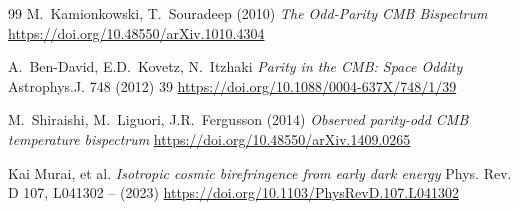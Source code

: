 \documentclass[11pt,a4paper]{article}
\theoremstyle{plain}
\theoremstyle{definition}
\begin{document}
\begin{thebibliography}{99}
M.~Kamionkowski, T.~Souradeep (2010)
\emph{The Odd-Parity CMB Bispectrum}
\url{https://doi.org/10.48550/arXiv.1010.4304}

A.~Ben-David, E.D.~Kovetz, N.~Itzhaki
\emph{Parity in the CMB: Space Oddity} Astrophys.J. 748 (2012) 39
\url{https://doi.org/10.1088/0004-637X/748/1/39}

M.~Shiraishi, M.~Liguori, J.R.~Fergusson (2014)
\emph{Observed parity-odd CMB temperature bispectrum}
\url{https://doi.org/10.48550/arXiv.1409.0265}

 Kai Murai, et al.
\emph{Isotropic cosmic birefringence from early dark energy}
Phys. Rev. D 107, L041302 – (2023)
\url{https://doi.org/10.1103/PhysRevD.107.L041302}



\end{thebibliography}
\end{document}

